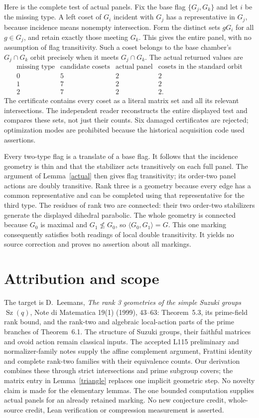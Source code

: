 \documentclass[11pt,a4paper]{article}
\newcommand{\Sz}{\operatorname{Sz}}
\newcommand{\gen}[1]{\langle#1\rangle}
\begin{document}
Here is the complete test of actual panels. Fix the base flag
$\{G_j,G_k\}$ and let $i$ be the missing type. A left coset of $G_i$
incident with $G_j$ has a representative in $G_j$, because incidence
means nonempty intersection. Form the distinct sets $gG_i$ for all
$g\in G_j$, and retain exactly those meeting $G_k$. This gives the
entire panel, with no assumption of flag transitivity. Such a coset
belongs to the base chamber's $G_j\cap G_k$ orbit precisely when it
meets $G_j\cap G_k$. The actual returned values are
\[
\begin{array}{c|c|c|c}
 \text{missing type}&\text{candidate cosets}&\text{actual panel}&
 \text{cosets in the standard orbit}\\\hline
 0&5&2&2\\1&7&2&2\\2&7&2&2.
\end{array}
\]
The certificate contains every coset as a literal matrix set and all
its relevant intersections. The independent reader reconstructs the
entire displayed test and compares these sets, not just their counts.
Six damaged certificates are rejected; optimization modes are prohibited
because the historical acquisition code used assertions.

Every two-type flag is a translate of a base flag. It follows that the
incidence geometry is thin and that the stabilizer acts transitively
on each full panel. The argument of Lemma~\ref{actual} then gives flag
transitivity; its order-two panel actions are doubly transitive. Rank
three is a geometry because every edge has a common representative and
can be completed using that representative for the third type. The
residues of rank two are connected: their two order-two stabilizers
generate the displayed dihedral parabolic. The whole geometry is
connected because $G_0$ is maximal and $G_1\nleq G_0$, so
$\gen{G_0,G_1}=G$. This one marking consequently satisfies both readings
of local double transitivity. It yields no source correction and proves
no assertion about all markings.

\section{Attribution and scope}
The target is D.~Leemans, \emph{The rank 3 geometries of the simple
Suzuki groups $\Sz(q)$}, Note di Matematica 19(1) (1999), 43--63:
Theorem~5.3, its prime-field rank bound, and the rank-two and algebraic
local-action parts of the prime branches of Theorem~6.1. The structure
of Suzuki groups, their faithful matrices and ovoid action remain
classical inputs. The accepted L115 preliminary and normalizer-family
notes supply the affine complement argument, Frattini identity and
complete rank-two families with their equivalence counts.
Our derivation combines these through strict intersections and prime
subgroup covers; the matrix entry in Lemma~\ref{triangle} replaces one
implicit geometric step. No novelty claim is made for the elementary
lemmas. The one bounded computation supplies actual panels for an already
retained marking. No new conjecture credit, whole-source credit, Lean
verification or compression measurement is asserted.
\end{document}

